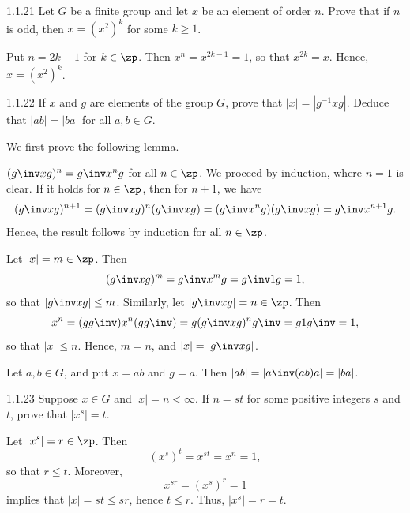 \begin{exercise}{1.1.21}
    Let $G$ be a finite group and let $x$ be an element of order $n$.
	Prove that if $n$ is odd, then $x = (x^2)^k$ for some $k \geq 1$.
\end{exercise}

\begin{sol}
    Put $n = 2k - 1$ for $k \in \zp$.
	Then $x^n = x^{2k - 1} = 1$, so that $x^{2k} = x$.
	Hence, $x = (x^2)^k$.
\end{sol}

\begin{spex}{1.1.22}
    If $x$ and $g$ are elements of the group $G$, prove that $|x| = |g^{-1} x g|$.
	Deduce that $|ab| = |ba|$ for all $a, b \in G$.
\end{spex}

\begin{sol}[spsol]
    We first prove the following lemma.
    \begin{lemma}{$(g\inv xg)^n = g\inv x^n g$ for all $n \in \zp$.}
        We proceed by induction, where $n = 1$ is clear.
	If it holds for $n \in \zp$, then for $n + 1$, we have
        \[
        	(g\inv xg)^{n + 1} = (g\inv xg)^n (g\inv xg) = (g\inv x^n g)(g\inv xg) = g\inv x^{n + 1} g.
        \]
        Hence, the result follows by induction for all $n \in \zp$.
    \end{lemma}
    Let $|x| = m \in \zp$.
	Then
    \[
    	(g\inv xg)^m = g\inv x^m g = g\inv 1 g = 1,
    \]
    so that $|g\inv xg| \leq m$.
	Similarly, let $|g\inv xg| = n \in \zp$.
	Then
    \[
    	x^n = (gg\inv) x^n (gg\inv) = g(g\inv xg)^n g\inv = g 1 g\inv = 1,
    \]
    so that $|x| \leq n$.
	Hence, $m = n$, and $|x| = |g\inv x g|$.

    Let $a, b \in G$, and put $x = ab$ and $g = a$.
	Then $|ab| = |a\inv(ab)a| = |ba|$.
\end{sol}

\begin{exercise}{1.1.23}
    Suppose $x \in G$ and $|x| = n < \infty$.
	If $n = st$ for some positive integers $s$ and $t$, prove that $|x^s| = t$.
\end{exercise}

\begin{sol}
    Let $|x^s| = r \in \zp$.
	Then
    \[
    	(x^s)^t = x^{st} = x^n = 1,
    \]
    so that $r \leq t$.
	Moreover,
    \[
    	x^{sr} = (x^s)^r = 1
    \]
    implies that $|x| = st \leq sr$, hence $t \leq r$.
	Thus, $|x^s| = r = t$.
\end{sol}

